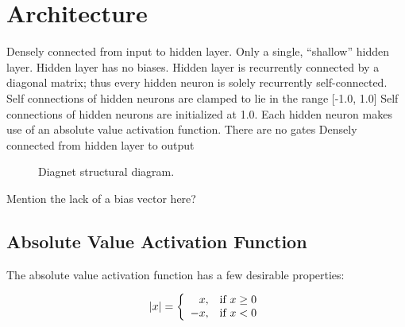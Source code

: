 \documentclass{article}
\begin{document}


\section{Architecture}
\label{headings}


Densely connected from input to hidden layer.
Only a single, “shallow” hidden layer.
Hidden layer has no biases.
Hidden layer is recurrently connected by a diagonal matrix; thus every hidden neuron is solely recurrently self-connected.
Self connections of hidden neurons are clamped to lie in the range [-1.0, 1.0]
Self connections of hidden neurons are initialized at 1.0.
Each hidden neuron makes use of an absolute value activation function.
There are no gates
Densely connected from hidden layer to output



\begin{figure}[h]
  \centering
  
  \caption{Diagnet structural diagram.}
\end{figure}



Mention the lack of a bias vector here?

\subsection{Absolute Value Activation Function}

The absolute value activation function has a few desirable properties: 

\begin{equation}
|x| =
\left\{
	\begin{array}{ll}
		\hfill x,  & \mbox{if } x \geq 0 \\
		-x, & \mbox{if } x < 0
	\end{array}
\right.
\end{equation}
\end{document}
